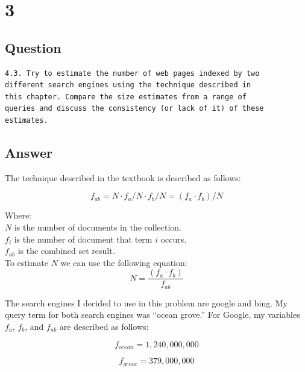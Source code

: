 \documentclass[letterpaper,11pt]{article}
\begin{document}
\section*{3}

\subsection*{Question}

\begin{verbatim}
4.3. Try to estimate the number of web pages indexed by two 
different search engines using the technique described in 
this chapter. Compare the size estimates from a range of 
queries and discuss the consistency (or lack of it) of these estimates.
\end{verbatim}

\subsection*{Answer}

The technique described in the textbook \cite{} is described as follows:

\begin{equation}\label{eq:est}
  f_{ab} = N \cdot f_a/N \cdot f_b/N = (f_a \cdot f_b)/N
\end{equation}

Where:\\
$N$ is the number of documents in the collection.\\
$f_i$ is the number of document that term $i$ occurs.\\
$f_{ab}$ is the combined set result.\\

To estimate $N$ we can use the following equation:
\begin{equation}
	N = \frac{(f_a \cdot f_b)}{f_{ab}}
\end{equation}

The search engines I decided to use in this problem are google and bing. 
My query term for both search engines was ``ocean grove.''
For Google, my variables $f_{a}$, $f_{b}$, and $f_{ab}$ are described as follows:

\begin{equation*}
	f_{ocean} = 1,240,000,000
\end{equation*}

\begin{equation*}
	f_{grove} = 379,000,000
\end{equation*}
\end{document}
